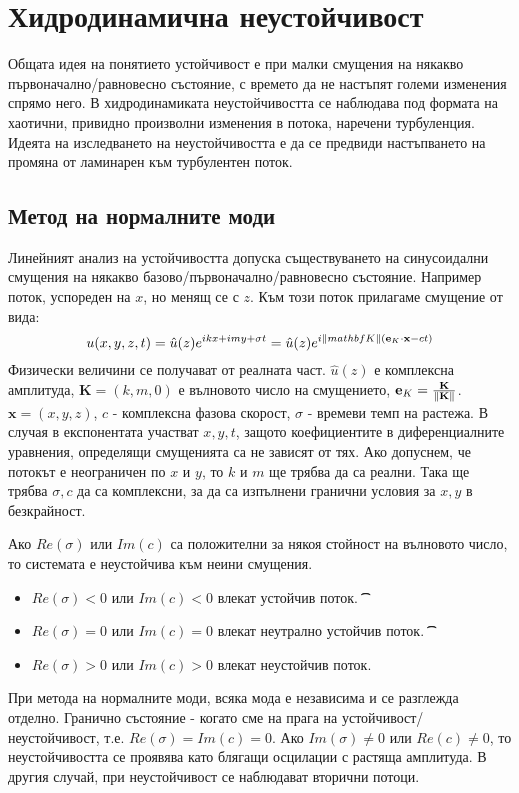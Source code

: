 \setcounter{equation}{0}
\section{Хидродинамична неустойчивост}
Общата идея на понятието устойчивост е при малки смущения на някакво първоначално/равновесно състояние, с времето да не настъпят големи изменения спрямо него.
В хидродинамиката неустойчивостта се наблюдава под формата на хаотични, привидно произволни изменения в потока, наречени турбуленция.
Идеята на изследването на неустойчивостта е да се предвиди настъпването на промяна от ламинарен към турбулентен поток.


\subsection{Метод на нормалните моди}
Линейният анализ на устойчивостта допуска съществуването на синусоидални смущения на някакво базово/първоначално/равновесно състояние.
Например поток, успореден на $x$, но менящ се с $z$. Към този поток прилагаме смущение от вида:
\begin{equation}
  u(x, y, z, t) = \hat{u}(z) e^{ikx + imy + \sigma t} = \hat{u}(z) e^{i \norm{mathbf{K}}(\mathbf{e}_K \cdot \mathbf{x} - ct)}
\end{equation}
Физически величини се получават от реалната част.
$\hat{u}(z)$ е комплексна амплитуда, $\mathbf{K} = (k, m, 0)$ е вълновото число на смущението, $\mathbf{e}_K=\frac{\mathbf{K}}{\norm{\mathbf{K}}}$.
$\mathbf{x} = (x, y, z)$, $c$ - комплексна фазова скорост, $\sigma$ - времеви темп на растежа.
В случая в експонентата участват $x, y, t$, защото коефициентите в диференциалните уравнения, определящи смущенията са не зависят от тях.
Ако допуснем, че потокът е неограничен по $x$ и $y$, то $k$ и $m$ ще трябва да са реални.
Така ще трябва $\sigma, c$ да са комплексни, за да са изпълнени гранични условия за $x, y$ в безкрайност.

Ако $Re(\sigma)$ или $Im(c)$ са положителни за някоя стойност на вълновото число, то системата е неустойчива към неини смущения.
\begin{itemize}
  \item $Re(\sigma) < 0$ или $Im(c) < 0$ влекат устойчив поток.
\t\t\item $Re(\sigma) = 0$ или $Im(c) = 0$ влекат неутрално устойчив поток.
\t\t\item $Re(\sigma) > 0$ или $Im(c) > 0$ влекат неустойчив поток.
\end{itemize}
При метода на нормалните моди, всяка мода е независима и се разглежда отделно.
Гранично състояние - когато сме на прага на устойчивост/неустойчивост, т.е. $Re(\sigma) = Im(c) = 0$.
Ако $Im(\sigma) \neq 0$ или $Re(c) \neq 0$, то неустойчивостта се проявява като блягащи осцилации с растяща амплитуда.
В другия случай, при неустойчивост се наблюдават вторични потоци.


